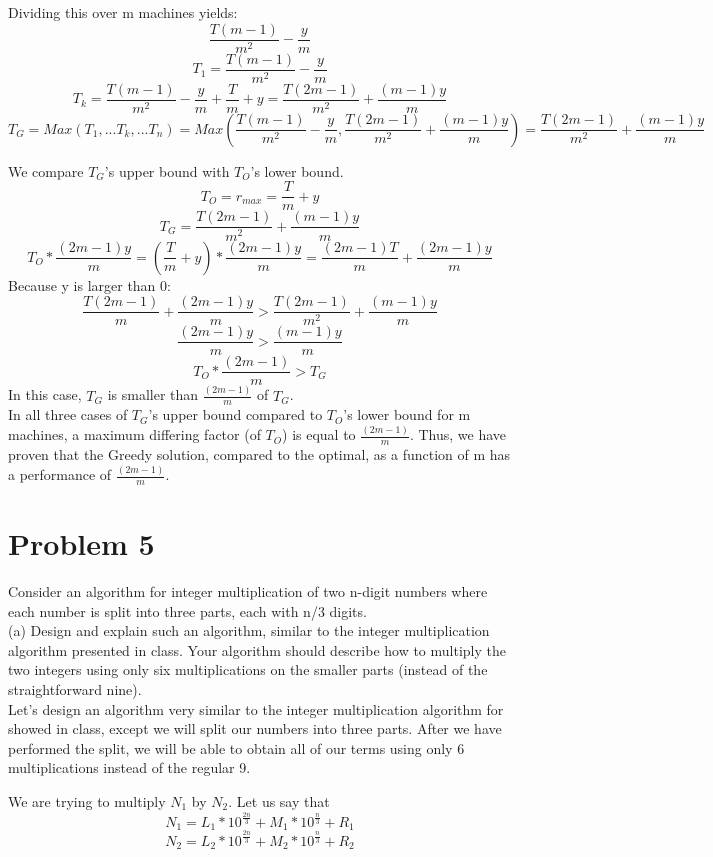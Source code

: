 \documentclass[11pt, solution, letterpaper]{format}
\begin{document}
Dividing this over m machines yields: $$\frac{T(m-1)}{m^2} - \frac{y}{m}$$
$$T_1 = \frac{T(m-1)}{m^2} - \frac{y}{m}$$
$$T_k = \frac{T(m-1)}{m^2} - \frac{y}{m} + \frac{T}{m} + y = \frac{T(2m - 1)}{m^2} + \frac{(m-1)y}{m}$$
$$T_G = Max(T_1, ...T_k,... T_n) = Max(\frac{T(m-1)}{m^2} - \frac{y}{m},\frac{T(2m - 1)}{m^2} + \frac{(m-1)y}{m}) = \frac{T(2m - 1)}{m^2} + \frac{(m-1)y}{m}$$

We compare $T_G$'s upper bound with $T_O$'s lower bound.\\
$$T_O = r_{max} = \frac{T}{m} + y$$
$$T_G = \frac{T(2m - 1)}{m^2} + \frac{(m-1)y}{m}$$
$$ T_O * \frac{(2m-1)y}{m} = (\frac{T}{m} + y) * \frac{(2m-1)y}{m} = \frac{(2m-1)T}{m} + \frac{(2m-1)y}{m}$$
Because y is larger than 0:
$$ \frac{T(2m-1)}{m} + \frac{(2m-1)y}{m} > \frac{T(2m - 1)}{m^2} + \frac{(m-1)y}{m}$$
$$ \frac{(2m-1)y}{m} > \frac{(m-1)y}{m}$$
$$T_O * \frac{(2m-1)}{m} > T_G$$
In this case, $T_G$ is smaller than $\frac{(2m-1)}{m}$ of $T_G$.\\

In all three cases of $T_G$'s upper bound compared to $T_O$'s lower bound for m machines, a maximum differing factor (of $T_O$) is equal to $\frac{(2m-1)}{m}$. Thus, we have proven that the Greedy solution, compared to the optimal, as a function of m has a performance of $\frac{(2m-1)}{m}$. \\

\clearpage
\section{Problem 5}
Consider an algorithm for integer multiplication of two n-digit numbers where each number is split into three parts,
each with n/3 digits.\\
(a) Design and explain such an algorithm, similar to the integer multiplication algorithm presented in class. Your
algorithm should describe how to multiply the two integers using only six multiplications on the smaller parts
(instead of the straightforward nine).\\

Let's design an algorithm very similar to the integer multiplication algorithm for showed in class, except we will split our numbers into three parts. After we have performed the split, we will be able to obtain all of our terms using only 6 multiplications instead of the regular 9.

We are trying to multiply $N_1$ by $N_2$.
Let us say that $$N_1 = L_1 * 10^{\frac{2n}{3}} + M_1 * 10^{\frac{n}{3}} + R_1$$ $$N_2 = L_2 * 10^{\frac{2n}{3}} + M_2 * 10^{\frac{n}{3}} + R_2$$
\end{document}
